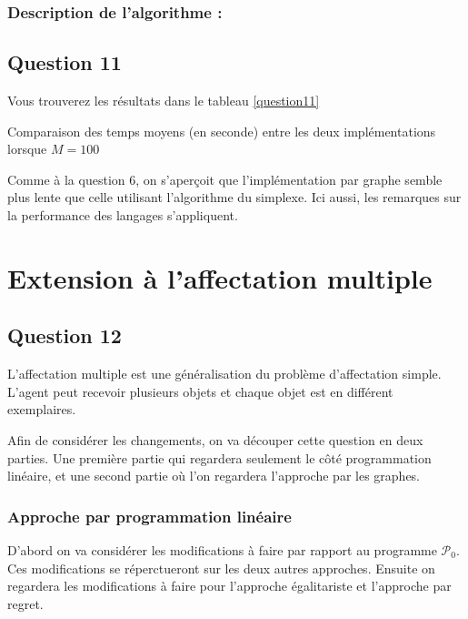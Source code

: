 \documentclass[a4paper, titlepage, oneside, 12pt]{article}%
\begin{document}
\subsubsection{Description de l'algorithme :}


\subsection{Question 11}
Vous trouverez les résultats dans le tableau \ref{question11}
\begin{table}[h]
\begin{center}
\caption{Comparaison des temps moyens (en seconde) entre les deux implémentations lorsque $M=100$}
\label{question11}
\end{center}
\end{table}

Comme à la question $6$, on s'aperçoit que l'implémentation par graphe semble plus lente que celle utilisant l'algorithme du simplexe. Ici aussi, les remarques sur la performance des langages s'appliquent.
\section{Extension à l'affectation multiple}

\subsection{Question 12}

L'affectation multiple est une généralisation du problème d'affectation simple. L'agent peut recevoir plusieurs objets et chaque objet est en différent exemplaires.

Afin de considérer les changements, on va découper cette question en deux parties. Une première partie qui regardera seulement le côté programmation linéaire, et une second partie où l'on regardera l'approche par les graphes.

\subsubsection{Approche par programmation linéaire}

D'abord on va considérer les modifications à faire par rapport au programme $\mathcal{P}_0$. Ces modifications se réperctueront sur les deux autres approches. Ensuite on regardera les modifications à faire pour l'approche égalitariste et l'approche par regret.
\end{document}
